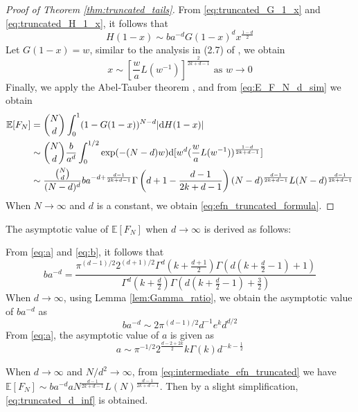 \documentclass[conference,a4paper]{IEEEtran}
\def\E{\mathbb{E}}
\def\d{\mathrm{d}}
\begin{document}
\begin{proof}[Proof of Theorem \ref{thm:truncated_tails}]
From \eqref{eq:truncated_G_1_x} and \eqref{eq:truncated_H_1_x}, it follows that
\begin{equation}
    H(1-x) \sim ba^{-d} G(1-x)^d x^{\frac{1-d}{2}}
\end{equation}
Let $G(1-x)=w$, similar to the analysis in (2.7) of
\cite{carnal1970konvexe}, we obtain
\begin{equation*}
     x \sim [\frac{w}{a} L(w^{-1})]^{\frac{2}{2k+d-1}} \textrm{ as } w \to 0
\end{equation*}
Finally, 
we apply the Abel-Tauber theorem
\cite{omey1989abelian}, and from \eqref{eq:E_F_N_d_sim} we obtain
\begin{align}
    \E[F_N] &= \binom{N}{d}\int_0^1 (1 - G(1-x))^{N-d} |\d H(1-x)| 
    \notag \\
    & \sim \binom{N}{d} \frac{b}{a^d} \int_0^{1/2} \exp(-(N-d)w) \d [w^d (\frac{w}{a} L(w^{-1}))^{\frac{1-d}{2k+d-1}} ]
    \notag \\
    &\sim \frac{\binom{N}{d}}{(N-d)^d} ba^{-d+\frac{d-1}{2k+d-1}}
    \Gamma 
    \left(d+1-\frac{d-1}{2k+d-1}\right)
    (N-d)^{\frac{d-1}{2k+d-1}}
    L(N-d)
    ^{\frac{d-1}{2k+d-1}}
    \label{eq:intermediate_efn_truncated}
\end{align}
When $N\to \infty$ and $d$ is a constant, we obtain \eqref{eq:efn_truncated_formula}.
\end{proof}

The asymptotic value of $\E[F_N]$ when $d\to \infty$
is derived as follows:

From \eqref{eq:a} and \eqref{eq:b}, it follows that
\begin{equation}
     ba^{-d}
     = \frac{\pi^{(d-1)/2} 2^{(d+1)/2}
     \Gamma^d(k+\frac{d+1}{2})
     \Gamma(d(k+\frac{d}{2}-1)+1)}{\Gamma^d(k+\frac{d}{2})\Gamma(d(k+\frac{d}{2}-1)+ \frac{3}{2})}
 \end{equation}
 When $d\to \infty$, using Lemma \ref{lem:Gamma_ratio},
 we obtain the asymptotic value of $ba^{-d}$ as
 \begin{equation}
     ba^{-d} \sim 2\pi^{(d-1)/2}
     d^{-1}e^kd^{d/2}
 \end{equation}
 From \eqref{eq:a}, the asymptotic value of $a$ is given as
 \begin{equation}
     a \sim \pi^{-1/2} 2^{\frac{d-2+2k}{2}} k \Gamma(k) d^{-k-\frac{1}{2}}
 \end{equation}

When $d\to \infty$ and $N/d^2\to \infty$,
from \eqref{eq:intermediate_efn_truncated}
we have $\E[F_N] \sim ba^{-d} a N^{\frac{d-1}{2k+d-1}}
L(N)
^{\frac{d-1}{2k+d-1}}$.
Then by a slight simplification,
\eqref{eq:truncated_d_inf} is obtained.
 
\end{document}
